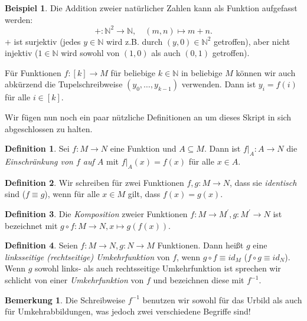 \documentclass[11pt, a4paper]{article}
\theoremstyle{definition}
\newtheorem{definition}{Definition}[section]
\newtheorem*{example*}{Beispiel}
\newtheorem*{remark*}{Bemerkung}
\theoremstyle{plain}
\numberwithin{equation}{section}
\begin{document}
\begin{example*}
	Die Addition zweier natürlicher Zahlen kann als Funktion aufgefasst werden:
	\[
		+\colon \mathbb{N}^2 \to \mathbb{N}, \quad (m, n) \mapsto m+n.
	\]
	\( + \) ist surjektiv (jedes \( y \in \mathbb{N} \) wird z.B. durch \( (y, 0) \in \mathbb{N}^2 \) getroffen), aber nicht injektiv (\( 1 \in \mathbb{N} \) wird sowohl von \( (1, 0) \) als auch \( (0, 1) \) getroffen).
\end{example*}
Für Funktionen \( f\colon [k] \to M \) für beliebige \( k \in \mathbb{N} \) in beliebige \( M \) können wir auch abkürzend die Tupelschreibweise \( (y_0, \ldots, y_{k-1}) \) verwenden. Dann ist \( y_i = f(i) \) für alle \( i \in [k] \).\par
Wir fügen nun noch ein paar nützliche Definitionen an um dieses Skript in sich abgeschlossen zu halten.
\begin{definition}
	Sei \( f\colon M \to N \) eine Funktion und \( A \subseteq M \). Dann ist \( f\vert_A\colon A \to N \) die \textit{Einschränkung von \( f \) auf \( A \)} mit \( f\vert_A(x) = f(x) \) für alle \( x \in A \).
\end{definition}
\begin{definition}
	Wir schreiben für zwei Funktionen \( f, g\colon M \to N \), dass sie \textit{identisch} sind (\( f \equiv g \)), wenn für alle \( x \in M \) gilt, dass \( f(x) = g(x) \).
\end{definition}
\begin{definition}
	Die \textit{Komposition} zweier Funktionen \( f\colon M \to M^\prime, g\colon M^\prime \to N \) ist bezeichnet mit \( g \circ f\colon M \to N, x \mapsto g(f(x)) \).
\end{definition}
\begin{definition}
	Seien \( f\colon M \to N, g\colon N \to M \) Funktionen. Dann heißt \( g \) eine \textit{linksseitige (rechtseitige) Umkehrfunktion} von \( f \), wenn \( g \circ f \equiv id_M \) (\( f \circ g \equiv id_N \)). Wenn \( g \) sowohl links- als auch rechtsseitige Umkehrfunktion ist sprechen wir schlicht von einer \textit{Umkehrfunktion} von \( f \) und bezeichnen diese mit \( f^{-1} \).
\end{definition}
\begin{remark*}
	Die Schreibweise \( f^{-1} \) benutzen wir sowohl für das Urbild als auch für Umkehrabbildungen, was jedoch zwei verschiedene Begriffe sind!
\end{remark*}
\end{document}
